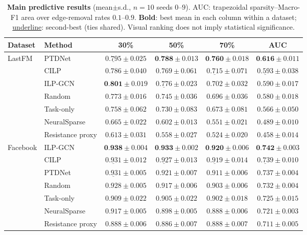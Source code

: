 \begin{table}[t]
\centering
\caption{\textbf{Main predictive results} (mean$\pm$s.d., $n{=}10$ seeds $0$--$9$).
AUC: trapezoidal sparsity--Macro-F1 area over edge-removal rates $0.1$--$0.9$.
\textbf{Bold}: best mean in each column within a dataset; \underline{underline}: second-best (ties shared).
Visual ranking does not imply statistical significance.}
\label{tab:main}
\scriptsize
\begin{tabular}{@{}llcccc@{}}
\toprule
Dataset & Method & 30\% & 50\% & 70\% & AUC \\
\midrule
\multirow{7}{*}{LastFM}
& PTDNet & $\underline{0.795}{\pm}0.025$ & $\textbf{0.788}{\pm}0.013$ & $\textbf{0.760}{\pm}0.018$ & $\textbf{0.616}{\pm}0.011$ \\
& CILP & $0.786{\pm}0.040$ & $0.769{\pm}0.061$ & $\underline{0.715}{\pm}0.071$ & $\underline{0.593}{\pm}0.038$ \\
& ILP-GCN & $\textbf{0.801}{\pm}0.019$ & $\underline{0.776}{\pm}0.023$ & $0.702{\pm}0.032$ & $0.590{\pm}0.017$ \\
& Random & $0.773{\pm}0.016$ & $0.745{\pm}0.036$ & $0.696{\pm}0.036$ & $0.580{\pm}0.018$ \\
& Task-only & $0.758{\pm}0.062$ & $0.730{\pm}0.083$ & $0.673{\pm}0.081$ & $0.566{\pm}0.050$ \\
& NeuralSparse & $0.665{\pm}0.022$ & $0.602{\pm}0.013$ & $0.551{\pm}0.021$ & $0.489{\pm}0.010$ \\
& Resistance proxy & $0.613{\pm}0.031$ & $0.558{\pm}0.027$ & $0.524{\pm}0.020$ & $0.458{\pm}0.014$ \\
\midrule
\multirow{7}{*}{Facebook}
& ILP-GCN & $\textbf{0.938}{\pm}0.004$ & $\textbf{0.933}{\pm}0.002$ & $\textbf{0.920}{\pm}0.006$ & $\textbf{0.742}{\pm}0.003$ \\
& CILP & $\underline{0.931}{\pm}0.012$ & $\underline{0.927}{\pm}0.013$ & $\underline{0.919}{\pm}0.014$ & $\underline{0.739}{\pm}0.010$ \\
& PTDNet & $\underline{0.931}{\pm}0.005$ & $0.921{\pm}0.007$ & $0.911{\pm}0.006$ & $0.737{\pm}0.004$ \\
& Random & $0.928{\pm}0.005$ & $0.917{\pm}0.006$ & $0.903{\pm}0.006$ & $0.732{\pm}0.004$ \\
& Task-only & $0.909{\pm}0.022$ & $0.905{\pm}0.022$ & $0.902{\pm}0.018$ & $0.725{\pm}0.015$ \\
& NeuralSparse & $0.917{\pm}0.005$ & $0.898{\pm}0.005$ & $0.888{\pm}0.006$ & $0.721{\pm}0.003$ \\
& Resistance proxy & $0.888{\pm}0.006$ & $0.886{\pm}0.007$ & $0.888{\pm}0.007$ & $0.711{\pm}0.005$ \\

\end{tabular}
\end{table}
